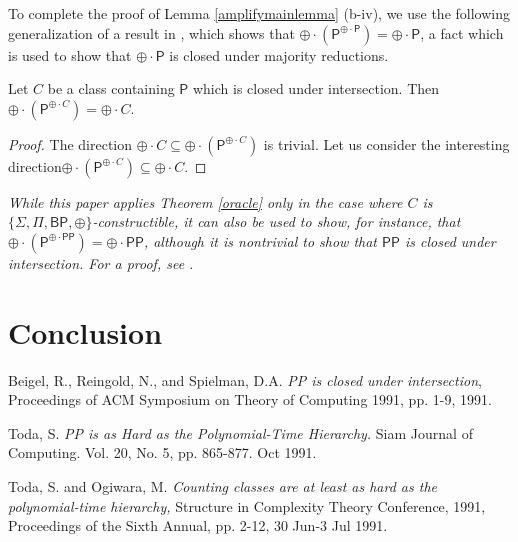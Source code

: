 \documentclass[11pt]{article}
\newcommand{\bp}{\textsf{BP}}
\newcommand{\parity}{\oplus}
\newcommand{\p}{\textsf{P}}
\newcommand{\pp}{\textsf{PP}}
\begin{document}
To complete the proof of Lemma \ref{amplifymainlemma} (b-iv), we use the following generalization of a result in \cite{Toda}, which shows that $\parity \cdot (\p ^{\parity\cdot\p}) = \parity\cdot\p$, a fact which is used to show that $\parity \cdot \p$ is closed under majority reductions.

\begin{theorem}\label{oracleparityc}
Let $C$ be a class containing \emph{$\p$} which is closed under intersection. Then\linebreak \emph{$\parity \cdot (\p^{\parity \cdot C}) = \parity \cdot C$}.
\end{theorem}
\begin{proof}
The direction $\parity \cdot C \subseteq \parity \cdot (\p^{\parity \cdot C})$ is trivial. Let us consider the interesting direction\linebreak $\parity \cdot (\p^{\parity \cdot C})\subseteq \parity\cdot C$.
\end{proof}
\begin{remark}\emph{
While this paper applies Theorem \ref{oracle} only in the case where $C$ is $\{\Sigma,\Pi,\bp,\parity\}$-constructible, it can also be used to show, for instance, that $\parity \cdot (\p^{\parity \cdot \pp}) = \parity \cdot \pp$, although it is nontrivial to show that $\pp$ is closed under intersection. For a proof, see \cite{Beigel}.
}\end{remark}

\section{Conclusion}

\pagebreak

\begin{thebibliography}{9}

 Beigel, R., Reingold, N., and Spielman, D.A. \emph{PP is closed under intersection}, Proceedings of ACM Symposium on Theory of Computing 1991, pp. 1-9, 1991.

Toda, S. \emph{PP is as Hard as the Polynomial-Time Hierarchy.} Siam Journal of Computing. Vol. 20, No. 5, pp. 865-877. Oct 1991.

 Toda, S. and Ogiwara, M. \emph{Counting classes are at least as hard as the polynomial-time hierarchy,} Structure in Complexity Theory Conference, 1991, Proceedings of the Sixth Annual, pp. 2-12, 30 Jun-3 Jul 1991.

\end{thebibliography}
\end{document}
